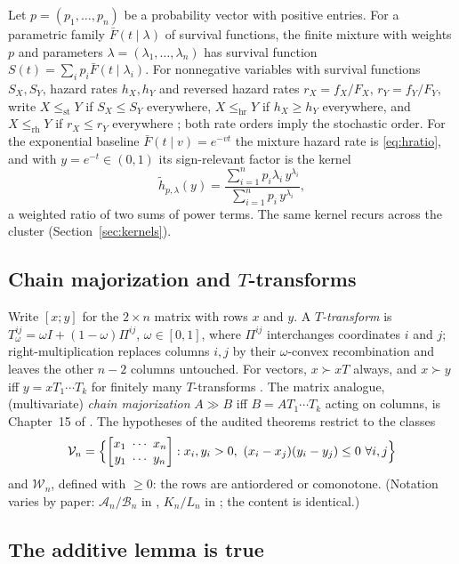 \documentclass[10pt]{article}
\theoremstyle{plain}
\theoremstyle{definition}
\theoremstyle{remark}
\newcommand{\hr}{\mathrm{hr}}
\newcommand{\rh}{\mathrm{rh}}
\newcommand{\st}{\mathrm{st}}
\newcommand{\bmat}[2]{\begin{bmatrix} #1 \\ #2 \end{bmatrix}}
\newcommand{\Vn}{\mathcal V_n}
\newcommand{\Wn}{\mathcal W_n}
\begin{document}
Let $p=(p_1,\dots,p_n)$ be a probability vector with positive entries. For a parametric family $\bar F(t\mid\lambda)$ of survival functions, the finite mixture with weights $p$ and parameters $\lambda=(\lambda_1,\dots,\lambda_n)$ has survival function $S(t)=\sum_i p_i\bar F(t\mid\lambda_i)$. For nonnegative variables with survival functions $S_X,S_Y$, hazard rates $h_X,h_Y$ and reversed hazard rates $r_X=f_X/F_X$, $r_Y=f_Y/F_Y$, write $X\le_{\st}Y$ if $S_X\le S_Y$ everywhere, $X\le_{\hr}Y$ if $h_X\ge h_Y$ everywhere, and $X\le_{\rh}Y$ if $r_X\le r_Y$ everywhere \cite{ShakedShanthikumar2007}; both rate orders imply the stochastic order. For the exponential baseline $\bar F(t\mid v)=e^{-vt}$ the mixture hazard rate is \eqref{eq:hratio}, and with $y=e^{-t}\in(0,1)$ its sign-relevant factor is the kernel
\begin{equation}\label{eq:kernel}
\tilde h_{p,\lambda}(y)=\frac{\sum_{i=1}^n p_i\lambda_i\,y^{\lambda_i}}{\sum_{i=1}^n p_i\,y^{\lambda_i}},
\end{equation}
a weighted ratio of two sums of power terms. The same kernel recurs across the cluster (Section~\ref{sec:kernels}).

\subsection{Chain majorization and \texorpdfstring{$T$}{T}-transforms}

Write $[x;y]$ for the $2\times n$ matrix with rows $x$ and $y$. A \emph{$T$-transform} is $T_\omega^{ij}=\omega I+(1-\omega)\Pi^{ij}$, $\omega\in[0,1]$, where $\Pi^{ij}$ interchanges coordinates $i$ and $j$; right-multiplication replaces columns $i,j$ by their $\omega$-convex recombination and leaves the other $n-2$ columns untouched. For vectors, $x\succ xT$ always, and $x\succ y$ iff $y=xT_1\cdots T_k$ for finitely many $T$-transforms \cite[Chapter~2.B]{MarshallOlkinArnold2011}. The matrix analogue, (multivariate) \emph{chain majorization} $A\gg B$ iff $B=AT_1\cdots T_k$ acting on columns, is Chapter~15 of \cite{MarshallOlkinArnold2011}. The hypotheses of the audited theorems restrict to the classes
\[
\Vn=\Bigl\{\bmat{x_1\ \cdots\ x_n}{y_1\ \cdots\ y_n}:x_i,y_i>0,\ (x_i-x_j)(y_i-y_j)\le0\ \forall i,j\Bigr\}
\]
and $\Wn$, defined with $\ge0$: the rows are antiordered or comonotone. (Notation varies by paper: $\mathcal A_n/\mathcal B_n$ in \cite{ShekariEtAl2026}, $K_n/L_n$ in \cite{GuoYan2024}; the content is identical.)

\subsection{The additive lemma is true}\label{sec:additive}
\end{document}
